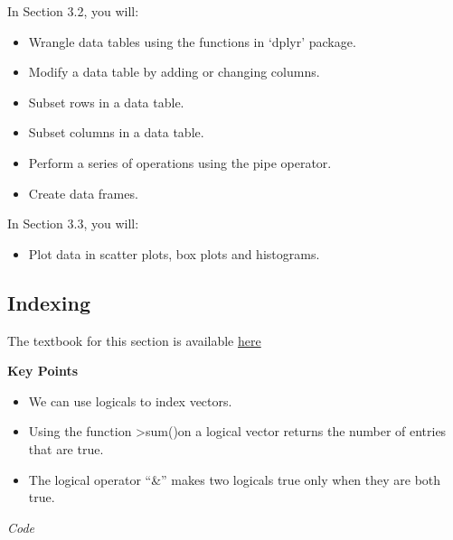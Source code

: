 \documentclass[
]{article}
\newenvironment{Shaded}{\begin{snugshade}}{\end{snugshade}}
\newcommand{\CommentTok}[1]{\textcolor[rgb]{0.56,0.35,0.01}{\textit{#1}}}
\newcommand{\DecValTok}[1]{\textcolor[rgb]{0.00,0.00,0.81}{#1}}
\newcommand{\FloatTok}[1]{\textcolor[rgb]{0.00,0.00,0.81}{#1}}
\newcommand{\NormalTok}[1]{#1}
\newcommand{\OperatorTok}[1]{\textcolor[rgb]{0.81,0.36,0.00}{\textbf{#1}}}
\newcommand{\StringTok}[1]{\textcolor[rgb]{0.31,0.60,0.02}{#1}}
\providecommand{\tightlist}{%
  \setlength{\itemsep}{0pt}\setlength{\parskip}{0pt}}
\begin{document}
In Section 3.2, you will:

\begin{itemize}
\tightlist
\item
  Wrangle data tables using the functions in `dplyr' package.
\item
  Modify a data table by adding or changing columns.
\item
  Subset rows in a data table.
\item
  Subset columns in a data table.
\item
  Perform a series of operations using the pipe operator.
\item
  Create data frames.
\end{itemize}

In Section 3.3, you will:

\begin{itemize}
\tightlist
\item
  Plot data in scatter plots, box plots and histograms.
\end{itemize}

\hypertarget{indexing}{%
\subsection{Indexing}\label{indexing}}

The textbook for this section is available
\href{https://rafalab.github.io/dsbook/r-basics.html\#indexing}{here}

\textbf{Key Points}

\begin{itemize}
\tightlist
\item
  We can use logicals to index vectors.
\item
  Using the function \textgreater sum()on a logical vector returns the
  number of entries that are true.
\item
  The logical operator ``\&'' makes two logicals true only when they are
  both true.
\end{itemize}

\emph{Code}

\begin{Shaded}
\end{Shaded}
\end{document}
